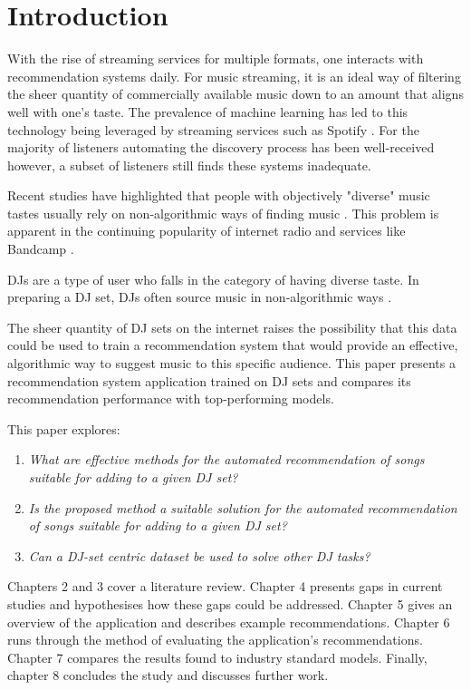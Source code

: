 
\graphicspath{{Chapter1/}}


\chapter{Introduction}
With the rise of streaming services for multiple formats, one interacts with recommendation systems daily. For music streaming, it is an ideal way of filtering the sheer quantity of commercially available music down to an amount that aligns well with one's taste. The prevalence of machine learning has led to this technology being leveraged by streaming services such as Spotify \citep{httpsresearchatspotifycommachine-learning_machine_2023}. For the majority of listeners automating the discovery process has been well-received however, a subset of listeners still finds these systems inadequate.

Recent studies have highlighted that people with objectively "diverse" music tastes usually rely on non-algorithmic ways of finding music \citep{anderson_algorithmic_2020}. This problem is apparent in the continuing popularity of internet radio and services like Bandcamp \citep{market_research_future_internet_2022} \citep{roberts_anti-spotify_2020}. 

DJs are a type of user who falls in the category of having diverse taste. In preparing a DJ set, DJs often source music in non-algorithmic ways \citep{allen_djs_2021}.

The sheer quantity of DJ sets on the internet raises the possibility that this data could be used to train a recommendation system that would provide an effective, algorithmic way to suggest music to this specific audience. This paper presents a recommendation system application trained on DJ sets and compares its recommendation performance with top-performing models.

This paper explores:

\begin{enumerate}
	\item \textit{What are effective methods for the automated recommendation of songs suitable for adding to a given DJ set?}
	\item \textit{Is the proposed method a suitable solution for the automated recommendation of songs suitable for adding to a given DJ set?}
	\item \textit{Can a DJ-set centric dataset be used to solve other DJ tasks?}
\end{enumerate}

Chapters 2 and 3 cover a literature review. Chapter 4 presents gaps in current studies and hypothesises how these gaps could be addressed. Chapter 5 gives an overview of the application and describes example recommendations. Chapter 6 runs through the method of evaluating the application's recommendations. Chapter 7 compares the results found to industry standard models. Finally, chapter 8 concludes the study and discusses further work.
 